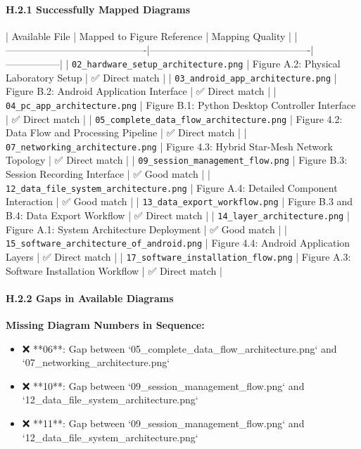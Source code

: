 \documentclass[11pt,a4paper]{article}
\begin{document}
{{\paragraph{H.2.1 Successfully Mapped Diagrams}

| Available File                            | Mapped to Figure Reference                      | Mapping Quality |
|-------------------------------------------|-------------------------------------------------|-----------------|
| \texttt{02\_hardware\_setup\_architecture.png}      | Figure A.2: Physical Laboratory Setup           | ✅ Direct match  |
| \texttt{03\_android\_app\_architecture.png}         | Figure B.2: Android Application Interface       | ✅ Direct match  |
| \texttt{04\_pc\_app\_architecture.png}              | Figure B.1: Python Desktop Controller Interface | ✅ Direct match  |
| \texttt{05\_complete\_data\_flow\_architecture.png}  | Figure 4.2: Data Flow and Processing Pipeline   | ✅ Direct match  |
| \texttt{07\_networking\_architecture.png}          | Figure 4.3: Hybrid Star-Mesh Network Topology   | ✅ Direct match  |
| \texttt{09\_session\_management\_flow.png}          | Figure B.3: Session Recording Interface         | ✅ Good match    |
| \texttt{12\_data\_file\_system\_architecture.png}    | Figure A.4: Detailed Component Interaction      | ✅ Good match    |
| \texttt{13\_data\_export\_workflow.png}             | Figure B.3 and B.4: Data Export Workflow        | ✅ Direct match  |
| \texttt{14\_layer\_architecture.png}               | Figure A.1: System Architecture Deployment      | ✅ Good match    |
| \texttt{15\_software\_architecture\_of\_android.png} | Figure 4.4: Android Application Layers          | ✅ Direct match  |
| \texttt{17\_software\_installation\_flow.png}       | Figure A.3: Software Installation Workflow      | ✅ Direct match  |

\paragraph{H.2.2 Gaps in Available Diagrams}

\textbf{Missing Diagram Numbers in Sequence:}

\begin{itemize}
\item ❌ **06**: Gap between `05_complete_data_flow_architecture.png` and `07_networking_architecture.png`
\item ❌ **10**: Gap between `09_session_management_flow.png` and `12_data_file_system_architecture.png`
\item ❌ **11**: Gap between `09_session_management_flow.png` and `12_data_file_system_architecture.png`


\end{itemize}}}
\end{document}
